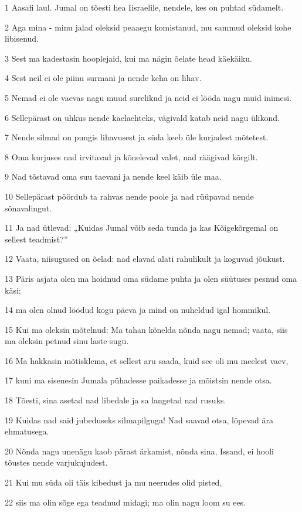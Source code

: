 \par 1 Aasafi laul. Jumal on tõesti hea Iisraelile, nendele, kes on puhtad südamelt.
\par 2 Aga mina - minu jalad oleksid peaaegu komistanud, mu sammud oleksid kohe libisenud.
\par 3 Sest ma kadestasin hooplejaid, kui ma nägin õelate head käekäiku.
\par 4 Sest neil ei ole piinu surmani ja nende keha on lihav.
\par 5 Nemad ei ole vaevas nagu muud surelikud ja neid ei lööda nagu muid inimesi.
\par 6 Sellepärast on uhkus nende kaelaehteks, vägivald katab neid nagu ülikond.
\par 7 Nende silmad on pungis lihavusest ja süda keeb üle kurjadest mõtetest.
\par 8 Oma kurjuses nad irvitavad ja kõnelevad valet, nad räägivad kõrgilt.
\par 9 Nad tõstavad oma suu taevani ja nende keel käib üle maa.
\par 10 Sellepärast pöördub ta rahvas nende poole ja nad rüüpavad nende sõnavalingut.
\par 11 Ja nad ütlevad: „Kuidas Jumal võib seda tunda ja kas Kõigekõrgemal on sellest teadmist?”
\par 12 Vaata, niisugused on õelad: nad elavad alati rahulikult ja koguvad jõukust.
\par 13 Päris asjata olen ma hoidnud oma südame puhta ja olen süütuses pesnud oma käsi;
\par 14 ma olen olnud löödud kogu päeva ja mind on nuheldud igal hommikul.
\par 15 Kui ma oleksin mõtelnud: Ma tahan kõnelda nõnda nagu nemad; vaata, siis ma oleksin petnud sinu laste sugu.
\par 16 Ma hakkasin mõtisklema, et sellest aru saada, kuid see oli mu meelest vaev,
\par 17 kuni ma sisenesin Jumala pühadesse paikadesse ja mõistsin nende otsa.
\par 18 Tõesti, sina asetad nad libedale ja sa langetad nad rusuks.
\par 19 Kuidas nad said jubeduseks silmapilguga! Nad saavad otsa, lõpevad ära ehmatusega.
\par 20 Nõnda nagu unenägu kaob pärast ärkamist, nõnda sina, Issand, ei hooli tõustes nende varjukujudest.
\par 21 Kui mu süda oli täis kibedust ja mu neerudes olid pisted,
\par 22 siis ma olin sõge ega teadnud midagi; ma olin nagu loom su ees.
